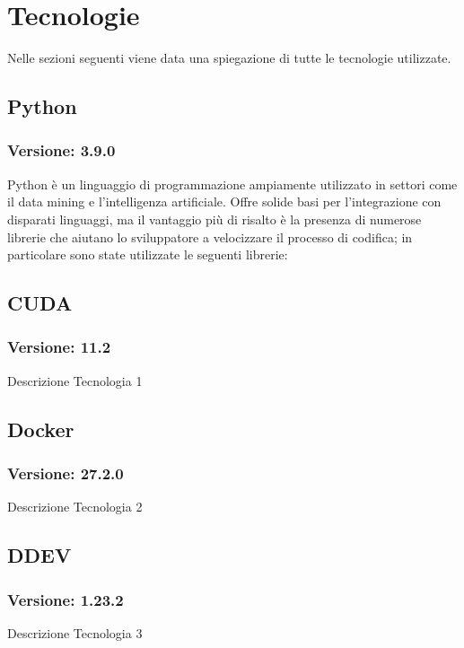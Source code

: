 \section{Tecnologie}
\label{sec:tecnologie-strumenti}

Nelle sezioni seguenti viene data una spiegazione di tutte le tecnologie utilizzate.

\subsection{Python}

\subsubsection{Versione: 3.9.0}
Python è un linguaggio di programmazione ampiamente utilizzato in settori come il data mining e l'intelligenza artificiale. 
Offre solide basi per l'integrazione con disparati linguaggi, ma il vantaggio più di risalto è la presenza di numerose librerie che aiutano lo sviluppatore a velocizzare il processo di codifica; in particolare sono state utilizzate le seguenti librerie:

\subsubsection{}

\subsection{CUDA}
\subsubsection{Versione: 11.2}
Descrizione Tecnologia 1

\subsection{Docker}
\subsubsection{Versione: 27.2.0}
Descrizione Tecnologia 2

\subsection{DDEV}
\subsubsection{Versione: 1.23.2}
Descrizione Tecnologia 3

